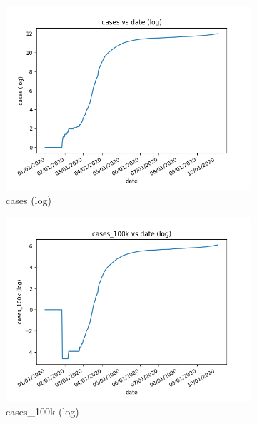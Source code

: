 \begin{figure}[h]
    \centering
    \begin{subfigure}[b]{0.24\linewidth}
        \includegraphics[width=\linewidth]{../figs/cases_log.png}
        \caption{cases (log)}
    \end{subfigure}
    \begin{subfigure}[b]{0.24\linewidth}
        \includegraphics[width=\linewidth]{../figs/cases_100k_log.png}
        \caption{cases\_100k (log)}
    \end{subfigure}
    \begin{subfigure}[b]{0.24\linewidth}

\end{subfigure}
\end{figure}
